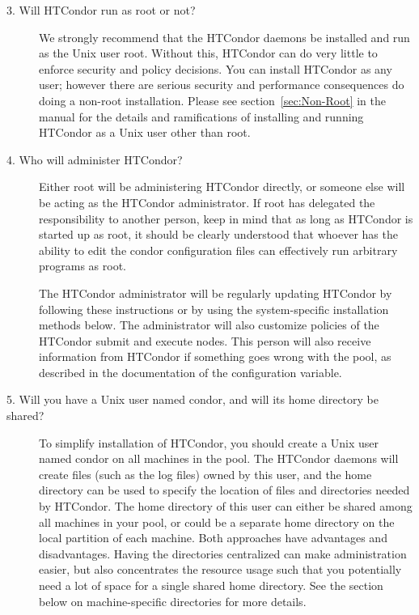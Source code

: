\begin{description}
\item[3. Will HTCondor run as root or not?]

We strongly recommend that the HTCondor daemons be installed and run
as the Unix user root.
Without this,
HTCondor can do very little to enforce security and policy
decisions.
You can install HTCondor as any user;
however there are serious security and performance consequences
do doing a non-root installation.
Please see section~\ref{sec:Non-Root}
in the manual for the details and ramifications of
installing and running HTCondor as a Unix user other than root.

\item[4. Who will administer HTCondor?]



Either root will be administering HTCondor directly, or someone else
will be acting as the HTCondor administrator.  If root has delegated
the responsibility to another person, keep in mind that as long as
HTCondor is started up as root, it should be clearly understood that
whoever has the ability to edit the condor configuration files can
effectively run arbitrary programs as root.

The HTCondor administrator will be regularly updating HTCondor by following
these instructions or by using the system-specific installation methods below.
The administrator
will also customize policies of the HTCondor submit and execute nodes.
This person will also receive information from HTCondor if 
something goes wrong with the pool, 
as described in the documentation of the 
configuration variable.

\item[5. Will you have a Unix user named condor, and will its home
directory be shared?]

To simplify installation of HTCondor, you should
create a Unix user named condor on all machines in the pool.
The HTCondor daemons will create files
(such as the log files) owned by this user,
and the home directory can be used to specify the location of files
and directories needed by HTCondor.  The home directory of this user can
either be shared among all machines in your pool, or could be a
separate home directory on the local partition of each machine.  Both
approaches have advantages and disadvantages.  Having the directories
centralized can make administration easier, but also concentrates the
resource usage such that you potentially need a lot of space for a
single shared home directory.  See the section below on
machine-specific directories for more details.


\end{description}
